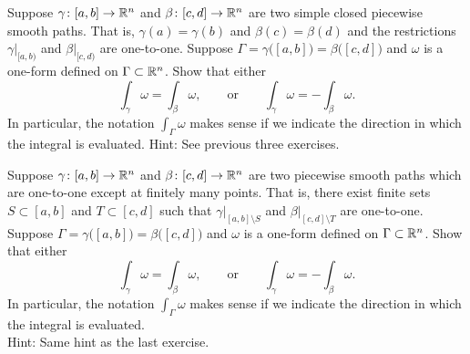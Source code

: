 \begin{exercise} \label{mv:exercise:closedcurveintegral}
\pagebreak[1]
Suppose $\gamma \colon [a,b] \to {\mathbb{R}}^n$ and
$\beta \colon [c,d] \to {\mathbb{R}}^n$ are two simple closed piecewise smooth paths.
That is, $\gamma(a)=\gamma(b)$ and $\beta(c) = \beta(d)$ and
the restrictions $\gamma|_{[a,b)}$ and $\beta|_{[c,d)}$ are one-to-one.
Suppose $\Gamma = \gamma\bigl([a,b]\bigr) = \beta\bigl([c,d]\bigr)$ and
$\omega$ is a one-form defined on $\Gamma \subset {\mathbb{R}}^n$.  Show that either
\begin{equation*}
\int_\gamma \omega = 
\int_\beta \omega,
\qquad \text{or} \qquad 
\int_\gamma \omega = 
- \int_\beta \omega.
\end{equation*}
In particular, the notation $\int_{\Gamma} \omega$ makes sense if we indicate
the direction in which the integral is evaluated.
Hint: See previous three exercises.
\end{exercise}

\begin{exercise} \label{mv:exercise:curveintegral}
Suppose $\gamma \colon [a,b] \to {\mathbb{R}}^n$ and
$\beta \colon [c,d] \to {\mathbb{R}}^n$ are two piecewise smooth paths
which are one-to-one except at finitely many points.  That is,
there exist finite sets $S \subset [a,b]$ and $T \subset [c,d]$
such that $\gamma|_{[a,b]\setminus S}$ and
$\beta|_{[c,d]\setminus T}$ are one-to-one.
Suppose $\Gamma = \gamma\bigl([a,b]\bigr) = \beta\bigl([c,d]\bigr)$ and $\omega$ is a
one-form defined on $\Gamma \subset {\mathbb{R}}^n$.  Show that either
\begin{equation*}
\int_\gamma \omega = 
\int_\beta \omega,
\qquad \text{or} \qquad 
\int_\gamma \omega = 
- \int_\beta \omega.
\end{equation*}
In particular, the notation $\int_{\Gamma} \omega$ makes sense if we indicate
the direction in which the integral is evaluated.
\\
Hint: Same hint as the last exercise.
\end{exercise}

